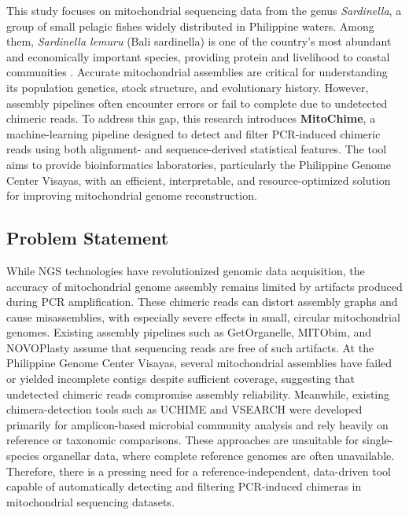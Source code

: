 This study focuses on mitochondrial sequencing data from the genus \textit{Sardinella}, a group of small pelagic fishes widely distributed in Philippine waters. Among them, \textit{Sardinella lemuru} (Bali sardinella) is one of the country’s most abundant and economically important species, providing protein and livelihood to coastal communities \citep{Willette2011,Labrador2021}. Accurate mitochondrial assemblies are critical for understanding its population genetics, stock structure, and evolutionary history. However, assembly pipelines often encounter errors or fail to complete due to undetected chimeric reads. To address this gap, this research introduces \textbf{MitoChime}, a machine-learning pipeline designed to detect and filter PCR-induced chimeric reads using both alignment- and sequence-derived statistical features. The tool aims to provide bioinformatics laboratories, particularly the Philippine Genome Center Visayas, with an efficient, interpretable, and resource-optimized solution for improving mitochondrial genome reconstruction.

\subsection{Problem Statement}\label{subsec:probstatement}

While NGS technologies have revolutionized genomic data acquisition, the accuracy of mitochondrial genome assembly remains limited by artifacts produced during PCR amplification. These chimeric reads can distort assembly graphs and cause misassemblies, with especially severe effects in small, circular mitochondrial genomes\cite{Boore1999,Cameron2014}. Existing assembly pipelines such as GetOrganelle, MITObim, and NOVOPlasty assume that sequencing reads are free of such artifacts\cite{Hahn2013,Dierckxsens2017,Jin2020}. At the Philippine Genome Center Visayas, several mitochondrial assemblies have failed or yielded incomplete contigs despite sufficient coverage, suggesting that undetected chimeric reads compromise assembly reliability. Meanwhile, existing chimera-detection tools such as UCHIME and VSEARCH were developed primarily for amplicon-based microbial community analysis and rely heavily on reference or taxonomic comparisons\cite{Edgar2011,Rognes2016}. These approaches are unsuitable for single-species organellar data, where complete reference genomes are often unavailable. Therefore, there is a pressing need for a reference-independent, data-driven tool capable of automatically detecting and filtering PCR-induced chimeras in mitochondrial sequencing datasets.

